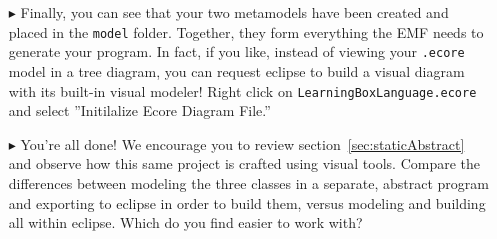\begin{itemize}
\item[$\blacktriangleright$] Finally, you can see that your two metamodels have been created and placed in the \texttt{model} folder. Together, they form everything the EMF needs to generate your program. In fact, if you like, instead of viewing your \texttt{.ecore} model in a tree diagram, you can request eclipse to build a visual diagram with its built-in visual modeler! Right click on \texttt{LearningBoxLanguage.ecore} and select ''Initilalize Ecore Diagram File.''


\item[$\blacktriangleright$] You're all done! We encourage you to review section~\ref{sec:staticAbstract} and observe how this same project is crafted using visual tools. Compare the differences between modeling the three classes in a separate, abstract program and exporting to eclipse in order to build them, versus modeling and building all within eclipse. Which do you find easier to work with?

\end{itemize}